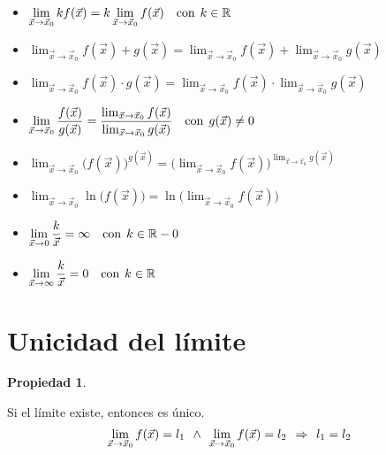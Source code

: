 \documentclass[a5paper,12pt,twoside]{book}
\newtheorem{prop}{{Propiedad}}[chapter]
\begin{document}
\begin{itemize}
\item $\displaystyle\lim_{\Vec{x} \to \Vec{x}_0} k f(\Vec{x}) = k \displaystyle\lim_{\Vec{x} \to \Vec{x}_0} f(\Vec{x}) \quad \textrm{con} \hspace{1ex} k \in \mathbb{R}$

\item $\displaystyle\lim_{\Vec{x} \to \Vec{x}_0} f(\Vec{x})+g(\Vec{x})=\displaystyle\lim_{\Vec{x} \to \Vec{x}_0} f(\Vec{x}) + \displaystyle\lim_{\Vec{x} \to \Vec{x}_0} g(\Vec{x})$

\item $\displaystyle\lim_{\Vec{x} \to \Vec{x}_0} f(\Vec{x}) \cdot g(\Vec{x})=\displaystyle\lim_{\Vec{x} \to \Vec{x}_0} f(\Vec{x}) \cdot \displaystyle\lim_{\Vec{x} \to \Vec{x}_0} g(\Vec{x})$

\item $\displaystyle\lim_{\Vec{x} \to \Vec{x}_0} \dfrac{f(\Vec{x})}{g(\Vec{x})} = \dfrac{\lim_{\Vec{x} \to \Vec{x}_0} f(\Vec{x})}{\lim_{\Vec{x} \to \Vec{x}_0} g(\Vec{x})} \quad \textrm{con} \hspace{1ex} g(\Vec{x}) \neq 0$

\item $\displaystyle\lim_{\Vec{x} \to \Vec{x}_0} \Big( f(\Vec{x}) \Big)^{g(\Vec{x})}= \Big( \displaystyle\lim_{\Vec{x} \to \Vec{x}_0} f(\Vec{x}) \Big)^{\lim_{\Vec{x} \to \Vec{x}_0} g(\Vec{x})}$

\item $\displaystyle\lim_{\Vec{x} \to \Vec{x}_0} \ln{\Big( f(\Vec{x}) \Big)} = \ln{\Big( \displaystyle\lim_{\Vec{x} \to \Vec{x}_0} f(\Vec{x}) \Big)}$

\item $\displaystyle\lim_{\Vec{x} \to 0} \dfrac{k}{\Vec{x}} = \infty \quad \textrm{con} \hspace{1ex} k \in \mathbb{R}-0$

\item $\displaystyle\lim_{\Vec{x} \to \infty} \dfrac{k}{\Vec{x}} = 0 \quad \textrm{con} \hspace{1ex} k \in \mathbb{R}$

\end{itemize}


\section{Unicidad del límite}

\begin{mdframed}[style=PropertyFrame]
    \begin{prop}
    \end{prop}
    Si el límite existe, entonces es único.
    \begin{equation*}
        \lim_{\Vec{x} \to \Vec{x}_0} f(\Vec{x}) = l_1  \hspace{1ex} \land \hspace{1ex} \lim_{\Vec{x} \to \Vec{x}_0} f(\Vec{x}) = l_2 \hspace{1ex} \Rightarrow \hspace{1ex} l_1=l_2
    \end{equation*}
\end{mdframed}
\end{document}
